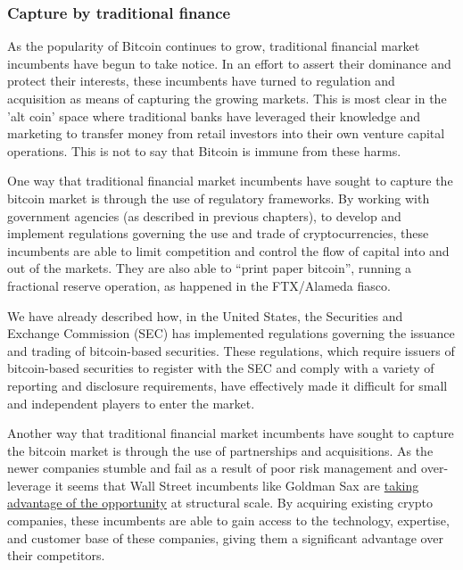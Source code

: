 \begin{itemize}
\subsubsection{Capture by traditional finance}
As the popularity of Bitcoin continues to grow, traditional financial market incumbents have begun to take notice. In an effort to assert their dominance and protect their interests, these incumbents have turned to regulation and acquisition as means of capturing the growing markets. This is most clear in the 'alt coin' space where traditional banks have leveraged their knowledge and marketing to transfer money from retail investors into their own venture capital operations. This is not to say that Bitcoin is immune from these harms.\par
One way that traditional financial market incumbents have sought to capture the bitcoin market is through the use of regulatory frameworks. By working with government agencies (as described in previous chapters), to develop and implement regulations governing the use and trade of cryptocurrencies, these incumbents are able to limit competition and control the flow of capital into and out of the markets. They are also able to ``print paper bitcoin'', running a fractional reserve operation, as happened in the FTX/Alameda fiasco.\par
We have already described how, in the United States, the Securities and Exchange Commission (SEC) has implemented regulations governing the issuance and trading of bitcoin-based securities. These regulations, which require issuers of bitcoin-based securities to register with the SEC and comply with a variety of reporting and disclosure requirements, have effectively made it difficult for small and independent players to enter the market. \par
Another way that traditional financial market incumbents have sought to capture the bitcoin market is through the use of partnerships and acquisitions. As the newer companies stumble and fail as a result of poor risk management and over-leverage it seems that Wall Street incumbents like Goldman Sax are \href{https://www.reuters.com/technology/goldman-sachs-hunt-bargain-crypto-firms-after-ftx-fiasco-2022-12-06/}{taking advantage of the opportunity} at structural scale. By acquiring existing crypto companies, these incumbents are able to gain access to the technology, expertise, and customer base of these companies, giving them a significant advantage over their competitors.\par

\end{itemize}
